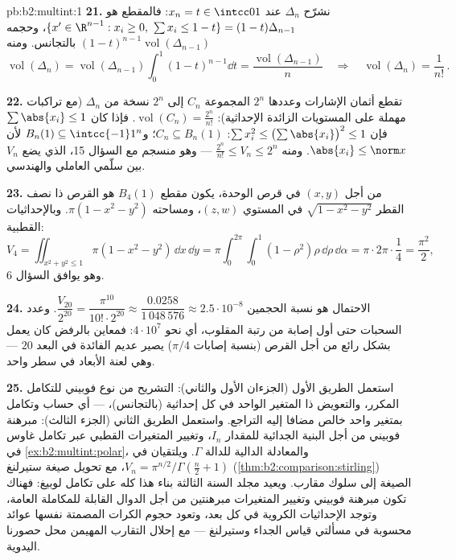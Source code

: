 \begin{solution}{pb:b2:multint:1}
\textbf{21.} نشرّح $\Delta_n$ عند $x_n = t \in \intcc01$: فالمقطع هو $\{x' \in \R^{n-1} : x_i \geq 0,\ \sum x_i \leq 1 -
t\} = (1-t)\Delta_{n-1}$، وحجمه
$(1-t)^{n-1}\operatorname{vol}(\Delta_{n-1})$ بالتجانس. ومنه
\[
\operatorname{vol}(\Delta_n) =
\operatorname{vol}(\Delta_{n-1})\int_0^1(1 - t)^{n-1}\dd t =
\frac{\operatorname{vol}(\Delta_{n-1})}{n}
\quad\Longrightarrow\quad
\operatorname{vol}(\Delta_n) = \frac1{n!}\,.
\]

\textbf{22.} تقطع أثمان الإشارات وعددها $2^n$ المجموعة $C_n$ إلى
$2^n$ نسخة من $\Delta_n$ (مع تراكبات مهملة على المستويات الزائدة
الإحداثية): $\operatorname{vol}(C_n) = \frac{2^n}{n!}$. فإذا كان $\sum\abs{x_i} \leq 1$ فإن $\sum x_i^2 \leq
\bigl(\sum\abs{x_i}\bigr)^2 \leq 1$: $C_n \subseteq B_n(1)$؛ و$B_n(1) \subseteq \intcc{-1}1^n$
لأن $\abs{x_i} \leq
\norm x$. ومنه $\frac{2^n}{n!} \leq V_n \leq 2^n$ --- وهو منسجم مع السؤال 15، الذي يضع $V_n$
بين سلّمي العاملي والهندسي.

\textbf{23.} من أجل $(x, y)$ في قرص الوحدة، يكون مقطع $B_4(1)$ هو القرص
ذا نصف القطر $\sqrt{1 - x^2 - y^2}$ في المستوي $(z, w)$، ومساحته $\pi(1 - x^2 - y^2)$. وبالإحداثيات
القطبية:
\[
V_4 = \iint_{x^2+y^2\leq1}\pi(1 - x^2 - y^2)\,\dd x\,\dd y
= \pi\int_0^{2\pi}\!\!\int_0^1(1 - \rho^2)\rho\,
\dd\rho\,\dd\alpha
= \pi\cdot2\pi\cdot\frac14 = \frac{\pi^2}2 ,
\]
وهو يوافق السؤال 6.

\textbf{24.} الاحتمال هو نسبة الحجمين $\dfrac{V_{20}}{2^{20}} = \dfrac{\pi^{10}}{10!\cdot2^{20}}
\approx \dfrac{0.0258}{1\,048\,576} \approx
2.5\cdot10^{-8}$. وعدد السحبات حتى أول
إصابة من رتبة المقلوب، أي نحو $4\cdot10^7$: فمعاين بالرفض كان يعمل بشكل
رائع من أجل القرص (بنسبة إصابات $\pi/4$) يصير عديم الفائدة في البعد
$20$ --- وهي لعنة الأبعاد في سطر واحد.

\textbf{25.} استعمل الطريق الأول (الجزءان الأول والثاني): التشريح من
نوع فوبيني للتكامل المكرر، والتعويض ذا المتغير الواحد في كل إحداثية
(بالتجانس)،  --- أي حساب  وتكامل بمتغير واحد
خالص مضافا إليه التراجع. واستعمل الطريق الثاني (الجزء الثالث):
مبرهنة فوبيني من أجل البنية الجدائية للمقدار $I_n$، وتغيير
المتغيرات القطبي عبر تكامل غاوس في \cref{ex:b2:multint:polar}، والمعادلة الدالية للدالة
$\Gamma$. ويلتقيان في $V_n =
\pi^{n/2}/\Gamma(\frac n2 + 1)$، مع تحويل صيغة ستيرلنغ (\cref{thm:b2:comparison:stirling}) الصيغة
إلى سلوك مقارب. ويعيد مجلد السنة الثالثة بناء هذا كله على تكامل
لوبيغ: فهناك تكون مبرهنة فوبيني وتغيير المتغيرات مبرهنتين من أجل
الدوال القابلة للمكاملة العامة، وتوجد الإحداثيات الكروية في كل بعد،
وتعود حجوم الكرات المصمتة نفسها عوائد محسوبة في مسألتي قياس الجداء
وستيرلنغ --- مع إحلال التقارب المهيمن محل حصورنا اليدوية.
\end{solution}
